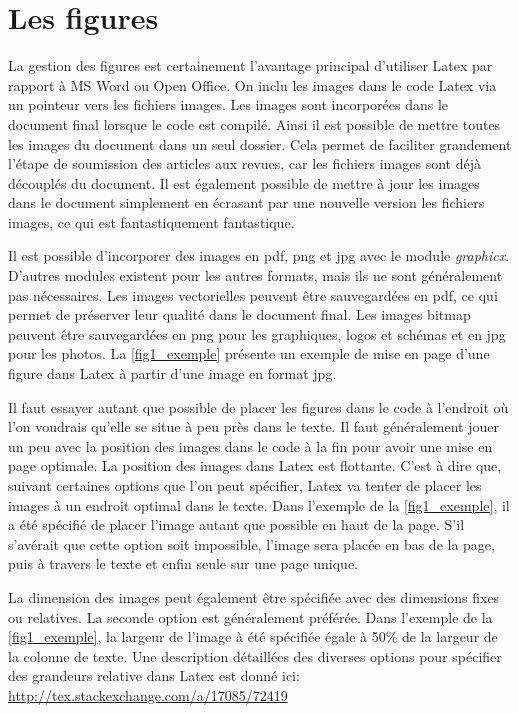 \documentclass[../exemple_master.tex]{subfiles}
\begin{document}
\section{Les figures}

La gestion des figures est certainement l'avantage principal d'utiliser Latex par rapport à MS Word ou Open Office. On inclu les images dans le code Latex via un pointeur vers les fichiers images. Les images sont incorporées dans le document final lorsque le code est compilé. Ainsi il est possible de mettre toutes les images du document dans un seul dossier. Cela permet de faciliter grandement l'étape de soumission des articles aux revues, car les fichiers images sont déjà découplés du document. Il est également possible de mettre à jour les images dans le document simplement en écrasant par une nouvelle version les fichiers images, ce qui est fantastiquement fantastique.

Il est possible d'incorporer des images en pdf, png et jpg avec le module \emph{graphicx}. D'autres modules existent pour les autres formats, mais ils ne sont généralement pas nécessaires. Les images vectorielles peuvent être sauvegardées en pdf, ce qui permet de préserver leur qualité dans le document final. Les images bitmap peuvent être sauvegardées en png pour les graphiques, logos et schémas et en jpg pour les photos. La \cref{fig1_exemple} présente un exemple de mise en page d'une figure dans Latex à partir d'une image en format jpg.

Il faut essayer autant que possible de placer les figures dans le code à l'endroit où l'on voudrais qu'elle se situe à peu près dans le texte. Il faut généralement jouer un peu avec la position des images dans le code à la fin pour avoir une mise en page optimale. La position des images dans Latex est flottante. C'est à dire que, suivant certaines options que l'on peut spécifier, Latex va tenter de placer les images à un endroit optimal dans le texte. Dans l'exemple de la \cref{fig1_exemple}, il a été spécifié de placer l'image autant que possible en haut de la page. S'il s'avérait que cette option soit impossible, l'image sera placée en bas de la page, puis à travers le texte et enfin seule sur une page unique.

La dimension des images peut également être spécifiée avec des dimensions fixes ou relatives. La seconde option est généralement préférée. Dans l'exemple de la \cref{fig1_exemple}, la largeur de l'image à été spécifiée égale à 50\% de la largeur de la colonne de texte. Une description détaillées des diverses options pour spécifier des grandeurs relative dans Latex est donné ici: \url{http://tex.stackexchange.com/a/17085/72419}
\end{document}
